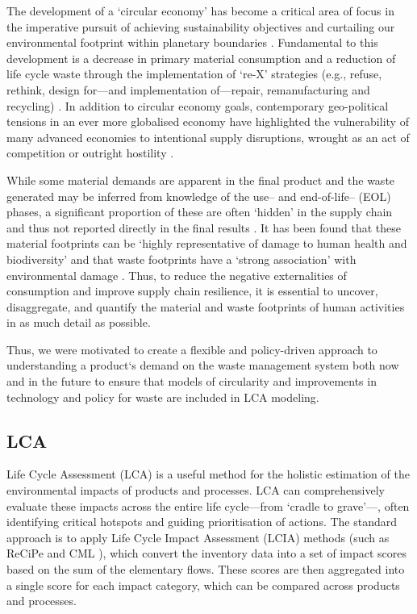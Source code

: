The development of a `circular economy' has become a critical area of focus in the imperative pursuit of achieving sustainability objectives and curtailing our environmental footprint within planetary boundaries \citep{eu2019greendeal, eu2020circ,nl2023ceplan,nl2016ceplan,pardo2018ce,ellenmacarthur2015ce}. Fundamental to this development is a decrease in primary material consumption and a reduction of life cycle waste through the implementation of `re-X' strategies (e.g., refuse, rethink, design for---and implementation of---repair, remanufacturing and recycling) \citep{eu2022ecodesign, eu2022repair,eu2015reman}. In addition to circular economy goals, contemporary geo-political tensions in an ever more globalised economy have highlighted the vulnerability of many advanced economies to intentional supply disruptions, wrought as an act of competition or outright hostility \citep{jrc2023supplychain,hartley2024cepolitics,berry2023crm}.

While some material demands are apparent in the final product and the waste generated may be inferred from knowledge of the use-- and end-of-life-- (EOL) phases, a significant proportion of these are often `hidden' in the supply chain and thus not reported directly in the final results \citep{laurenti2016wastefootprint,salviulo2021supplychain}. It has been found that these material footprints can be `highly representative of damage to human health and biodiversity' \citep{steinmann2017resourcefootprints} and that waste footprints have a `strong association' with environmental damage \citep{laurenti2023wastefootprint}. Thus, to reduce the negative externalities of consumption and improve supply chain resilience, it is essential to uncover, disaggregate, and quantify the material and waste footprints of human activities in as much detail as possible.

Thus, we were motivated to create a flexible and policy-driven approach to understanding a product`s demand on the waste management system both now and in the future to ensure that models of circularity and improvements in technology and policy for waste are included in LCA modeling.

\subsection{LCA}

Life Cycle Assessment (LCA) is a useful method for the holistic estimation of the environmental impacts of products and processes. LCA can comprehensively evaluate these impacts across the entire life cycle---from `cradle to grave'---, often identifying critical hotspots and guiding prioritisation of actions. The standard approach is to apply Life Cycle Impact Assessment (LCIA) methods (such as ReCiPe \citep{huijbregts2016recipe} and CML \citep{guinee2002cml}), which convert the inventory data into a set of impact scores based on the sum of the elementary flows. These scores are then aggregated into a single score for each impact category, which can be compared across products and processes.

